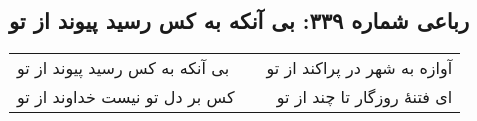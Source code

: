 \begin{center}
\section*{رباعی شماره ۳۳۹: بی آنکه به کس رسید پیوند از تو}
\label{sec:sh339}
\begin{longtable}{l p{0.5cm} r}
بی آنکه به کس رسید پیوند از تو
&&
آوازه به شهر در پراکند از تو
\\
کس بر دل تو نیست خداوند از تو
&&
ای فتنهٔ روزگار تا چند از تو
\\
\end{longtable}
\end{center}
